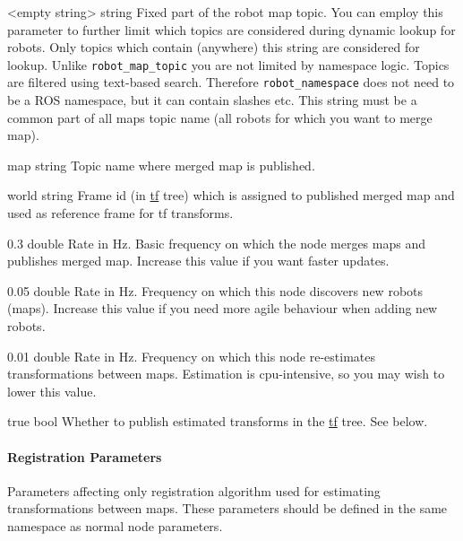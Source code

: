 
{<empty string>}
{string}
{Fixed part of the robot map topic. You can employ this parameter to further limit which topics are considered during dynamic lookup for robots. Only topics which contain (anywhere) this string are considered for lookup. Unlike \texttt{robot\_map\_topic} you are not limited by namespace logic. Topics are filtered using text-based search. Therefore \texttt{robot\_namespace} does not need to be a \gls{ROS} namespace, but it can contain slashes etc. This string must be a common part of all maps topic name (all robots for which you want to merge map).}

{map}
{string}
{Topic name where merged map is published.}

{world}
{string}
{Frame id (in \href{http://wiki.ros.org/tf}{tf} tree) which is assigned to published merged map and used as reference frame for tf transforms.}

{0.3}
{double}
{Rate in Hz. Basic frequency on which the node merges maps and publishes merged map. Increase this value if you want faster updates.}

{0.05}
{double}
{Rate in Hz. Frequency on which this node discovers new robots (maps). Increase this value if you need more agile behaviour when adding new robots.}

{0.01}
{double}
{Rate in Hz. Frequency on which this node re-estimates transformations between maps. Estimation is cpu-intensive, so you may wish to lower this value.}

{true}
{bool}
{Whether to publish estimated transforms in the \href{http://wiki.ros.org/tf}{tf} tree. See below.}

\paragraph{Registration Parameters}
\label{sec:registration-param}

Parameters affecting only registration algorithm used for estimating transformations between maps. These parameters should be defined in the same namespace as normal node parameters.

